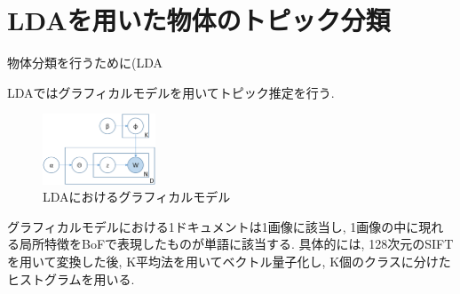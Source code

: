 \section{LDAを用いた物体のトピック分類}
物体分類を行うために(LDA

LDAではグラフィカルモデルを用いてトピック推定を行う.
\begin{figure}[h!]
	\begin{center}
		\includegraphics[width=0.30\textwidth,clip]{img/graphicalmodel.eps}
	\end{center}
	\caption{LDAにおけるグラフィカルモデル}
	\label{fig:graphical_model}
\end{figure} 
\par
グラフィカルモデルにおける1ドキュメントは1画像に該当し, 
1画像の中に現れる局所特徴をBoFで表現したものが単語に該当する.
具体的には, 128次元のSIFT\cite{}を用いて変換した後, 
K平均法\cite{kmeans}を用いてベクトル量子化し, K個のクラスに分けたヒストグラムを用いる.
\par


